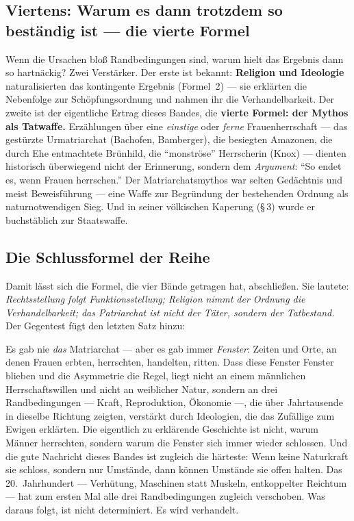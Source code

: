 \documentclass[11pt,a4paper,ngerman]{scrartcl}
\newcommand{\chipbase}[2]{\hspace{0pt}{\footnotesize\textcolor{#1}{[\textsc{#2}]}}}
\newcommand{\chipbelegt}[1]{\chipbase{chipgreen}{#1}}
\newenvironment{callout}[2]{%
  \def\FrameCommand{{\color{#1}\vrule width 2pt}\hspace{8pt}}%
  \MakeFramed{\advance\hsize-\width\FrameRestore}%
  \noindent{\small\scshape\color{#1}#2}\par\smallskip\small
}{\endMakeFramed\medskip}
\begin{document}
\subsection*{Viertens: Warum es dann trotzdem so beständig ist --- die vierte Formel}
Wenn die Ursachen bloß Randbedingungen sind, warum hielt das Ergebnis dann so hartnäckig? Zwei Verstärker. Der erste ist bekannt: \textbf{Religion und Ideologie} naturalisierten das kontingente Ergebnis (Formel~2) --- sie erklärten die Nebenfolge zur Schöpfungsordnung und nahmen ihr die Verhandelbarkeit. Der zweite ist der eigentliche Ertrag dieses Bandes, die \textbf{vierte Formel: der Mythos als Tatwaffe.} Erzählungen über eine \emph{einstige} oder \emph{ferne} Frauenherrschaft --- das gestürzte Urmatriarchat (Bachofen, Bamberger), die besiegten Amazonen, die durch Ehe entmachtete Brünhild, die \enquote{monströse} Herrscherin (Knox) --- dienten historisch überwiegend nicht der Erinnerung, sondern dem \emph{Argument}: \enquote{So endet es, wenn Frauen herrschen.} Der Matriarchatsmythos war selten Gedächtnis und meist Beweisführung --- eine Waffe zur Begründung der bestehenden Ordnung als naturnotwendigen Sieg. Und in seiner völkischen Kaperung (§\,3) wurde er buchstäblich zur Staatswaffe. \chipbelegt{belegt}

\subsection*{Die Schlussformel der Reihe}
Damit lässt sich die Formel, die vier Bände getragen hat, abschließen. Sie lautete: \emph{Rechtsstellung folgt Funktionsstellung; Religion nimmt der Ordnung die Verhandelbarkeit; das Patriarchat ist nicht der Täter, sondern der Tatbestand.} Der Gegentest fügt den letzten Satz hinzu:

\begin{callout}{gold}{Schlussformel}
Es gab nie \emph{das} Matriarchat --- aber es gab immer \emph{Fenster}: Zeiten und Orte, an denen Frauen erbten, herrschten, handelten, ritten. Dass diese Fenster Fenster blieben und die Asymmetrie die Regel, liegt nicht an einem männlichen Herrschaftswillen und nicht an weiblicher Natur, sondern an drei Randbedingungen --- Kraft, Reproduktion, Ökonomie ---, die über Jahrtausende in dieselbe Richtung zeigten, verstärkt durch Ideologien, die das Zufällige zum Ewigen erklärten. Die eigentlich zu erklärende Geschichte ist nicht, warum Männer herrschten, sondern warum die Fenster sich immer wieder schlossen. Und die gute Nachricht dieses Bandes ist zugleich die härteste: Wenn keine Naturkraft sie schloss, sondern nur Umstände, dann können Umstände sie offen halten. Das 20.~Jahrhundert --- Verhütung, Maschinen statt Muskeln, entkoppelter Reichtum --- hat zum ersten Mal alle drei Randbedingungen zugleich verschoben. Was daraus folgt, ist nicht determiniert. Es wird verhandelt.
\end{callout}
\end{document}

